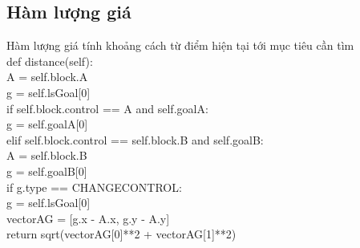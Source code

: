 \documentclass[a4paper]{article}
\begin{document}
\subsection{Hàm lượng giá}
\begin{flushleft}
\hspace{1 cm}	Hàm lượng giá tính khoảng cách từ điểm hiện tại tới mục tiêu cần tìm\\
\hspace{2 cm}	def distance(self):\\
\hspace{3 cm}	A = self.block.A\\
\hspace{3 cm}	g = self.lsGoal[0]\\
\hspace{3 cm}	if self.block.control == A and self.goalA:\\
\hspace{4 cm}	g = self.goalA[0]\\
\hspace{3 cm}	elif self.block.control == self.block.B and self.goalB:\\
\hspace{4 cm}	A = self.block.B\\
\hspace{4 cm}	g = self.goalB[0]\\
\hspace{3 cm}	if g.type == CHANGECONTROL:\\
\hspace{4 cm}	g = self.lsGoal[0]\\
\hspace{3 cm}	vectorAG = [g.x - A.x, g.y - A.y]\\
\hspace{3 cm}	return sqrt(vectorAG[0]**2 + vectorAG[1]**2)\\
\end{flushleft}
\end{document}
